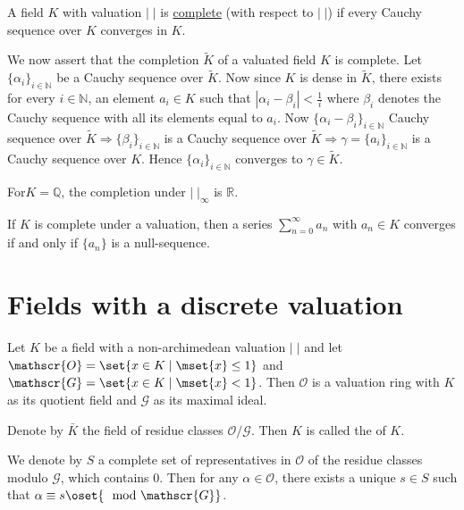 \begin{defi*}
A field $K$ with valuation $|\;|$ is \underline{complete} (with 
respect to $|\;|$) if every Cauchy sequence over $K$ converges in $K$. 
\end{defi*}

We now assert that the completion $\tilde{K}$ of a valuated field $K$ 
is complete. Let $\{\alpha_i\}_{i\in\mathbb{N}}$ be a Cauchy sequence 
over $\tilde{K}$. Now since $K$ is dense in $\tilde{K}$, there exists 
for every $i\in\mathbb{N}$, an element $a_i\in K$ such that 
$|\alpha_i-\beta_i|<\frac{1}{i}$ where $\beta_i$ denotes the Cauchy 
sequence with all its elements equal to $a_i$. Now 
$\{\alpha_i-\beta_i\}_{i\in\mathbb{N}}$ Cauchy sequence over 
$\tilde{K}\Rightarrow\{\beta_i\}_{i\in\mathbb{N}}$ is a Cauchy 
sequence over $\tilde{K}\Rightarrow\gamma=\{a_i\}_{i\in\mathbb{N}}$ is 
a Cauchy sequence over $K$. Hence $\{\alpha_i\}_{i\in\mathbb{N}}$ 
converges to $\gamma\in\tilde{K}$.

\begin{remark}\label{rem:1}
For\pageoriginale $K=\mathbb{Q}$, the completion under $|\;|_\infty$ 
is $\mathbb{R}$.
\end{remark}

\begin{remark}\label{rem:2}
If $K$ is complete under a  valuation, then 
a series $\sum\limits_{n=0}^\infty a_n$ with $a_n\in K$ converges if 
and only if $\{a_n\}$ is a null-sequence.
\end{remark}

\section{Fields with a discrete valuation}\label{sec0.5}
Let $K$ be a field with a non-archimedean valuation $|\;|$ and let 
$\mathscr{O}=\set{x\in K\mid \mset{x}\leq 1}$ and 
$\mathscr{G}=\set{x\in K\mid\mset{x}<1}$. Then $\mathscr{O}$ is a 
valuation ring with $K$ as its quotient field and $\mathscr{G}$ as its 
maximal ideal.

Denote by $\bar{K}$ the field of residue classes 
$\mathscr{O}/\mathscr{G}$. Then $K$ is called the  of $K$.

We denote by $S$ a complete set of representatives in $\mathscr{O}$ of 
the residue classes modulo $\mathscr{G}$, which contains $0$. Then for 
any $\alpha\in\mathscr{O}$, there exists a unique $s\in S$ such that 
$\alpha\equiv s\oset{\mod\mathscr{G}}$. 

